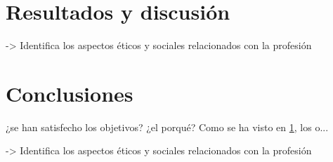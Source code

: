 \documentclass{article}
\begin{document}
\section{Resultados y discusión}\label{sec:ResultadosDisc}

-> Identifica los aspectos éticos y sociales relacionados con la profesión


\section{Conclusiones}\label{sec:Conclusiones}

 ¿se han satisfecho los objetivos? ¿el porqué? Como se ha visto en \ref{sec:ResultadosDisc}, los o...

-> Identifica los aspectos éticos y sociales relacionados con la profesión




\end{document}
